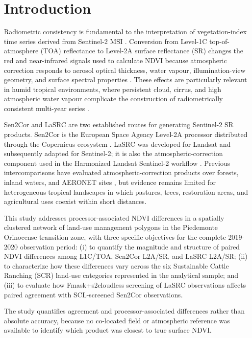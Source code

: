 \documentclass[remotesensing,article,submit,pdftex,oneauthor]{Definitions/mdpi}
\begin{document}
\section{Introduction}\label{sec-intro}

Radiometric consistency is fundamental to the interpretation of
vegetation-index time series derived from Sentinel-2 MSI
\citep{Drusch2012}. Conversion from Level-1C top-of-atmosphere (TOA)
reflectance to Level-2A surface reflectance (SR) changes the red and
near-infrared signals used to calculate NDVI because atmospheric
correction responds to aerosol optical thickness, water vapour,
illumination-view geometry, and surface spectral properties
\citep{Doxani2018, Martins2017, Marujo2021}. These effects are
particularly relevant in humid tropical environments, where persistent
cloud, cirrus, and high atmospheric water vapour complicate the
construction of radiometrically consistent multi-year series
\citep{Chraibi2022}.

Sen2Cor and LaSRC are two established routes for generating Sentinel-2
SR products. Sen2Cor is the European Space Agency Level-2A processor
distributed through the Copernicus ecosystem
\citep{MainKnorn2017, ESA2026Sen2Cor}. LaSRC was developed for Landsat
and subsequently adapted for Sentinel-2; it is also the
atmospheric-correction component used in the Harmonized Landsat
Sentinel-2 workflow \citep{Vermote2016, Vermote2018, Claverie2018}.
Previous intercomparisons have evaluated atmospheric-correction products
over forests, inland waters, and AERONET sites
\citep{Martins2017, Marujo2021, Chraibi2022}, but evidence remains
limited for heterogeneous tropical landscapes in which pastures, trees,
restoration areas, and agricultural uses coexist within short distances.

This study addresses processor-associated NDVI differences in a
spatially clustered network of land-use management polygons in the
Piedemonte Orinocense transition zone, with three specific objectives
for the complete 2019-2020 observation period: (i) to quantify the
magnitude and structure of paired NDVI differences among L1C/TOA,
Sen2Cor L2A/SR, and LaSRC L2A/SR; (ii) to characterize how these
differences vary across the six Sustainable Cattle Ranching (SCR)
land-use categories represented in the analytical sample; and (iii) to
evaluate how Fmask+s2cloudless screening of LaSRC observations affects
paired agreement with SCL-screened Sen2Cor observations.

The study quantifies agreement and processor-associated differences
rather than absolute accuracy, because no co-located field or
atmospheric reference was available to identify which product was
closest to true surface NDVI.
\end{document}
